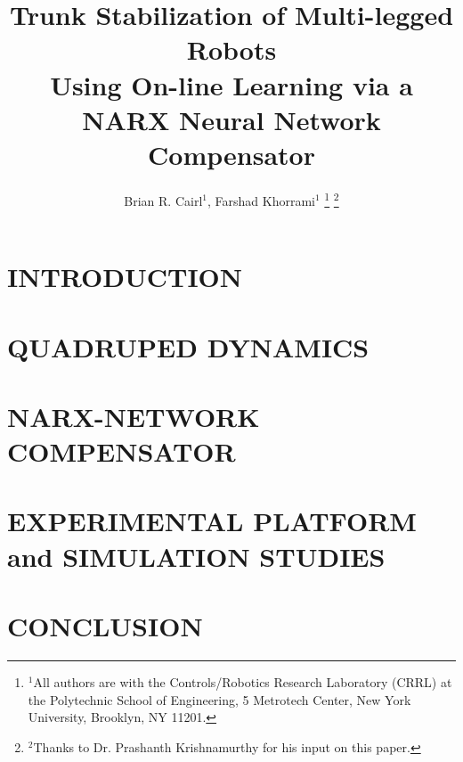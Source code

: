 \documentclass[letterpaper, 10 pt, conference]{ieeeconf}  %
\title{\LARGE \bf
Trunk Stabilization of Multi-legged Robots \\
Using On-line Learning via a NARX Neural Network Compensator
}
\author{
Brian R. Cairl$^{1}$,
Farshad Khorrami$^{1}$
\thanks{%
	$^{1}$All authors are with the Controls/Robotics Research Laboratory (CRRL)
	at the Polytechnic School of Engineering,
	5 Metrotech Center, New York University, Brooklyn, NY 11201.
}%
\thanks{
	$^{2}$Thanks to Dr. Prashanth Krishnamurthy for his input on this paper.
}
}%
\begin{document}
\newcommand{\TightSectionBeg}[1]{\vspace{0mm}\section{#1}\vspace{-0.1mm}}
\newcommand{\TightSectionEnd}{\vspace{-0.1mm}}
\newcommand{\PostImageCloseSpace}{\vspace{-4mm}}

\maketitle
\thispagestyle{empty}
\pagestyle{empty}


\begin{abstract}



\end{abstract}


\section{INTRODUCTION}

%
%
\TightSectionBeg{QUADRUPED DYNAMICS}

\TightSectionEnd
%
%
\TightSectionBeg{NARX-NETWORK COMPENSATOR}

\TightSectionEnd
%
%
\TightSectionBeg{EXPERIMENTAL PLATFORM and SIMULATION STUDIES}

\TightSectionEnd
%
%
\TightSectionBeg{CONCLUSION}

\TightSectionEnd
%
%
%
%




\end{document}
